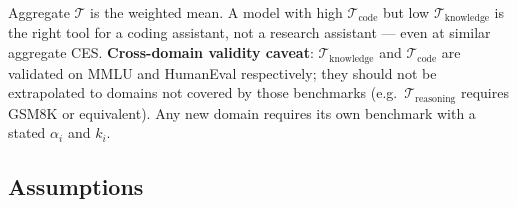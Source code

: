 \documentclass[12pt]{article}
\begin{document}
Aggregate $\mathcal{T}$ is the weighted mean. A model with high $\mathcal{T}_{\text{code}}$ but low $\mathcal{T}_{\text{knowledge}}$ is the right tool for a coding assistant, not a research assistant --- even at similar aggregate CES. \textbf{Cross-domain validity caveat}: $\mathcal{T}_{\text{knowledge}}$ and $\mathcal{T}_{\text{code}}$ are validated on MMLU and HumanEval respectively; they should not be extrapolated to domains not covered by those benchmarks (e.g.\ $\mathcal{T}_{\text{reasoning}}$ requires GSM8K or equivalent). Any new domain requires its own benchmark with a stated $\alpha_i$ and $k_i$.

\subsection{Assumptions}
\end{document}
